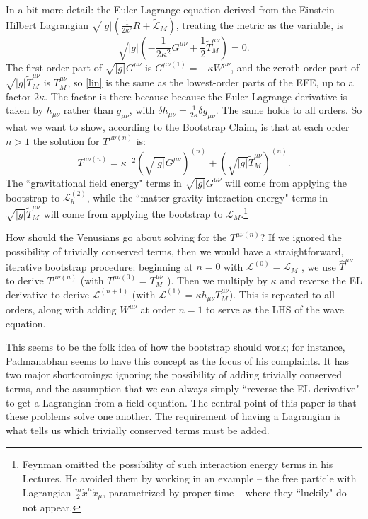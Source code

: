\documentclass[aps,physrev,preprint,groupedaddress]{revtex4-2}
\begin{document}
In a bit more detail: the Euler-Lagrange equation derived from the Einstein-Hilbert Lagrangian \(\sqrt{|g|}(\frac{1}{2\kappa^2}R+\widetilde{\mathcal{L}}_M)\), treating the metric as the variable, is \begin{equation}
    \sqrt{|g|}\left(-\frac{1}{2\kappa^2}G^{\mu\nu}+\frac{1}{2}\widetilde{T}_M^{\mu\nu}\right)=0.
\end{equation} The first-order part of \(\sqrt{|g|}G^{\mu\nu}\) is \(G^{\mu\nu(1)}=-\kappa W^{\mu\nu}\), and the zeroth-order part of \(\sqrt{|g|}\widetilde{T}_M^{\mu\nu}\) is \(T_M^{\mu\nu}\), so \eqref{lin} is the same as the lowest-order parts of the EFE, up to a factor \(2\kappa\). The factor is there because because the Euler-Lagrange derivative is taken by \(h_{\mu\nu}\) rather than \(g_{\mu\nu}\), with \(\delta h_{\mu\nu}=\frac{1}{2\kappa}\delta g_{\mu\nu}\). The same holds to all orders. So what we want to show, according to the Bootstrap Claim, is that at each order \(n>1\) the solution for \(T^{\mu\nu(n)}\) is: 
\begin{equation}
     T^{\mu\nu(n)}=\kappa^{-2}\left(\sqrt{|g|}G^{\mu\nu}\right)^{(n)} +\left(\sqrt{|g|}\widetilde{T}_M^{\mu\nu}\right)^{(n)}.
\end{equation}
The ``gravitational field energy" terms in \(\sqrt{|g|}G^{\mu\nu}\) will come from applying the bootstrap to \(\mathcal{L}_h^{(2)}\), while the ``matter-gravity interaction energy" terms in \(\sqrt{|g|}\widetilde{T}_M^{\mu\nu}\) will come from applying the bootstrap to \(\mathcal{L}_M\).\footnote{Feynman omitted the possibility of such interaction energy terms in his Lectures. He avoided them by working in an example -- the free particle with Lagrangian \(\frac{m}{2}\dot{x}^\mu\dot{x}_\mu\), parametrized by proper time -- where they ``luckily" do not appear.}

How should the Venusians go about solving for the \(T^{\mu\nu(n)}\)? If we ignored the possibility of trivially conserved terms, then we would have a straightforward, iterative bootstrap procedure: beginning at \(n = 0\) with \(\mathcal{L}^{(0)} = \mathcal{L}_M\) , we use \(\widehat{T}^{\mu\nu}\) to derive \(T^{\mu\nu(n)}\) (with \(T^{\mu\nu(0)} = T_M^{\mu\nu}\) ). Then we multiply by \(\kappa\) and reverse the EL derivative to derive \(\mathcal{L}^{(n+1)}\) (with \(\mathcal{L}^{(1)} = \kappa h_{\mu\nu}T_M^{\mu\nu}\)). This is repeated to all orders, along with adding \(W^{\mu\nu}\) at order $n=1$ to serve as the LHS of the wave equation. 

This seems to be the folk idea of how the bootstrap should work; for instance, Padmanabhan\cite{Padmanabhan} seems to have this concept as the focus of his complaints. It has two major shortcomings: ignoring the possibility of adding trivially conserved terms, and the assumption that we can always simply ``reverse the EL derivative" to get a Lagrangian from a field equation. The central point of this paper is that these problems solve one another. The requirement of having a Lagrangian is what tells us which trivially conserved terms must be added.
\end{document}
